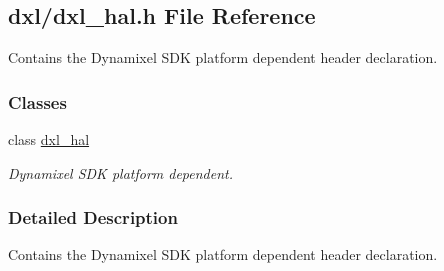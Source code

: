 \hypertarget{a00013}{}\subsection{dxl/dxl\+\_\+hal.h File Reference}
\label{a00013}


Contains the Dynamixel S\+D\+K platform dependent header declaration.  


\subsubsection*{Classes}
\begin{DoxyCompactItemize}
\item 
class \hyperlink{a00003}{dxl\+\_\+hal}
\begin{DoxyCompactList}\small\item\em Dynamixel S\+D\+K platform dependent. \end{DoxyCompactList}\end{DoxyCompactItemize}


\subsubsection{Detailed Description}
Contains the Dynamixel S\+D\+K platform dependent header declaration. 

